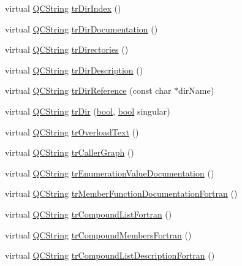 \begin{DoxyCompactItemize}
\item 
virtual \hyperlink{class_q_c_string}{Q\+C\+String} \hyperlink{class_translator_german_a2d33bc79fb65d698807ea46532d50551}{tr\+Dir\+Index} ()
\item 
virtual \hyperlink{class_q_c_string}{Q\+C\+String} \hyperlink{class_translator_german_a7e5726b5c6331a54de31316e61ebf9fe}{tr\+Dir\+Documentation} ()
\item 
virtual \hyperlink{class_q_c_string}{Q\+C\+String} \hyperlink{class_translator_german_a42df8de10bf821b0372b4061919c73fc}{tr\+Directories} ()
\item 
virtual \hyperlink{class_q_c_string}{Q\+C\+String} \hyperlink{class_translator_german_a33eef9cc312569c52faebe8c88a30973}{tr\+Dir\+Description} ()
\item 
virtual \hyperlink{class_q_c_string}{Q\+C\+String} \hyperlink{class_translator_german_af052928213c7388e1f63f40d536507c0}{tr\+Dir\+Reference} (const char $\ast$dir\+Name)
\item 
virtual \hyperlink{class_q_c_string}{Q\+C\+String} \hyperlink{class_translator_german_ab6d10fdf35b3ba3de9aeefa8544f00a8}{tr\+Dir} (\hyperlink{qglobal_8h_a1062901a7428fdd9c7f180f5e01ea056}{bool}, \hyperlink{qglobal_8h_a1062901a7428fdd9c7f180f5e01ea056}{bool} singular)
\item 
virtual \hyperlink{class_q_c_string}{Q\+C\+String} \hyperlink{class_translator_german_aeef7e1abd5dd7f5dc69d9e32f0c3b109}{tr\+Overload\+Text} ()
\item 
virtual \hyperlink{class_q_c_string}{Q\+C\+String} \hyperlink{class_translator_german_a67e49f4354c664aa49f700c02db17838}{tr\+Caller\+Graph} ()
\item 
virtual \hyperlink{class_q_c_string}{Q\+C\+String} \hyperlink{class_translator_german_a085a9273d752197639c39b41f97c3447}{tr\+Enumeration\+Value\+Documentation} ()
\item 
virtual \hyperlink{class_q_c_string}{Q\+C\+String} \hyperlink{class_translator_german_a5aba68025b2a7fb7eda6667c5b4d6064}{tr\+Member\+Function\+Documentation\+Fortran} ()
\item 
virtual \hyperlink{class_q_c_string}{Q\+C\+String} \hyperlink{class_translator_german_aa89dfd6d04b73644ba166a6c02ccc79b}{tr\+Compound\+List\+Fortran} ()
\item 
virtual \hyperlink{class_q_c_string}{Q\+C\+String} \hyperlink{class_translator_german_aaa1c746edc25df3bd518e362ed2d06a9}{tr\+Compound\+Members\+Fortran} ()
\item 
virtual \hyperlink{class_q_c_string}{Q\+C\+String} \hyperlink{class_translator_german_a3a072c8499f837b155d57d94d7f179cc}{tr\+Compound\+List\+Description\+Fortran} ()

\end{DoxyCompactItemize}
